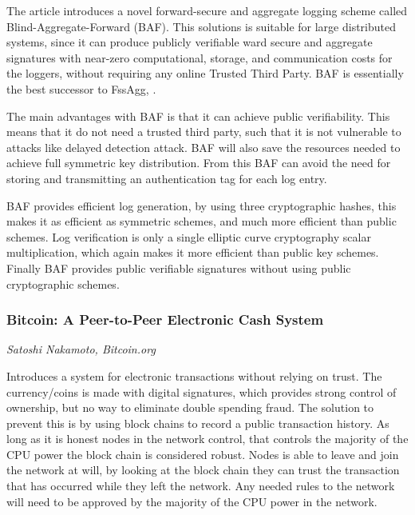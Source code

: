 The article introduces a novel forward-secure and aggregate logging
scheme called Blind-Aggregate-Forward (BAF). This solutions is
suitable for large distributed systems, since it can produce publicly
verifiable ward secure and aggregate signatures with near-zero
computational, storage, and communication costs for the loggers,
without requiring any online Trusted Third Party.  BAF is essentially
the best successor to FssAgg, .

The main advantages with BAF is that it can achieve public
verifiability. This means that it do not need a trusted third party,
such that it is not vulnerable to attacks like delayed detection
attack. BAF will also save the resources needed to achieve full
symmetric key distribution. From this BAF can avoid the need for
storing and transmitting an authentication tag for each log entry.

BAF provides efficient log generation, by using three cryptographic
hashes, this makes it as efficient as symmetric schemes, and much more
efficient than public schemes. Log verification is only a single
elliptic curve cryptography scalar multiplication, which again makes
it more efficient than public key schemes. Finally BAF provides public
verifiable signatures without using public cryptographic
schemes.~\cite{baf}

\subsubsection{Bitcoin: A Peer-to-Peer Electronic Cash System}
\vspace{-3mm}
{\footnotesize \it Satoshi Nakamoto, Bitcoin.org}~\cite{nakamoto}

Introduces a system for electronic transactions without relying on
trust. The currency/coins is made with digital signatures, which
provides strong control of ownership, but no way to eliminate double
spending fraud. The solution to prevent this is by using block chains
to record a public transaction history. As long as it is honest nodes
in the network control, that controls the majority of the CPU power
the block chain is considered robust. Nodes is able to leave and join
the network at will, by looking at the block chain they can trust the
transaction that has occurred while they left the network. Any needed
rules to the network will need to be approved by the majority of the
CPU power in the network.~\cite{nakamoto}
